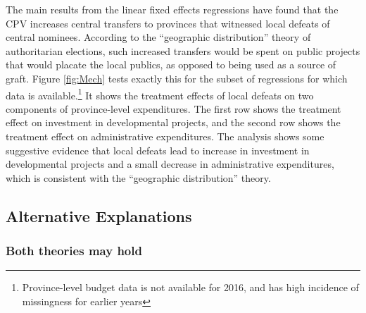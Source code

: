 \documentclass[12pt]{article}\usepackage[]{graphicx}\usepackage[]{color}
\newcommand{\1}{\mathbbm{1}}
\begin{document}
The main results from the linear fixed effects regressions have found that the CPV increases central transfers to provinces that witnessed local defeats of central nominees. According to the ``geographic distribution'' theory of authoritarian elections, such increased transfers would be spent on public projects that would placate the local publics, as opposed to being used as a source of graft. Figure \ref{fig:Mech} tests exactly this for the subset of regressions for which data is available.\footnote{Province-level budget data is not available for 2016, and has high incidence of missingness for earlier years} It shows the treatment effects of local defeats on two components of province-level expenditures. The first row shows the treatment effect on investment in developmental projects, and the second row shows the treatment effect on administrative expenditures. The analysis shows some suggestive evidence that local defeats lead to increase in investment in developmental projects and a small decrease in administrative expenditures, which is consistent with the ``geographic distribution'' theory.


\subsection{Alternative Explanations}


\subsubsection{Both theories may hold}
\end{document}
